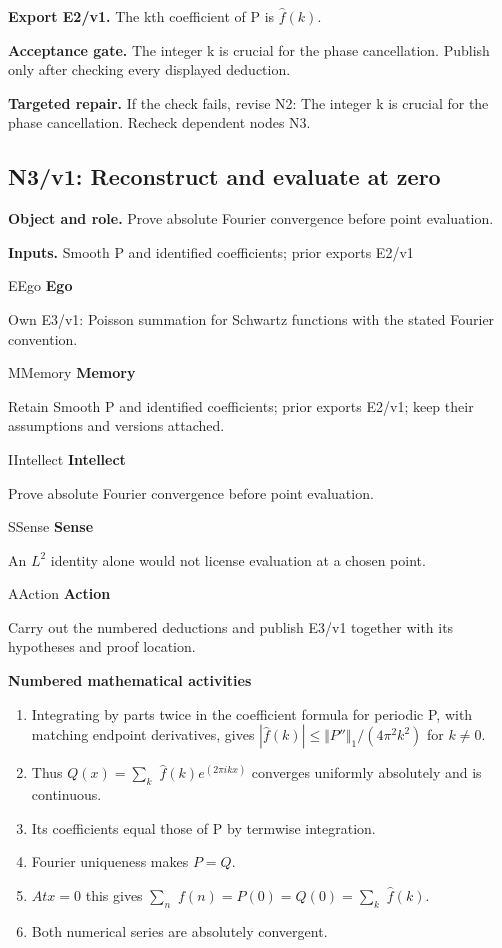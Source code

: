 \documentclass[preprint,12pt,aps,pra,showkeys,amsmath,amssymb,superscriptaddress,floatfix]{revtex4-2}
\theoremstyle{definition}
\theoremstyle{remark}
\newcommand{\mmfaculty}[3]{%
 \begin{mmfacultybox}{#1}{#2}
 {\sffamily\bfseries\color{MMBlue}#2}\par\smallskip #3
 \end{mmfacultybox}}
\newcommand{\field}[2]{\par\smallskip\noindent\textbf{#1.} #2\par}
\begin{document}
\field{Export E2/v1}{The kth coefficient of P is \(\widehat f(k)\).}

\field{Acceptance gate}{The integer k is crucial for the phase cancellation. Publish only after
checking every displayed deduction.}

\field{Targeted repair}{If the check fails, revise N2: The integer k is crucial for the phase
cancellation. Recheck dependent nodes N3.}

\clearpage

\subsection{N3/v1: Reconstruct and evaluate at zero}

\field{Object and role}{Prove absolute Fourier convergence before point evaluation.}

\field{Inputs}{Smooth P and identified coefficients; prior exports E2/v1}

\mmfaculty{E}{Ego}{Own E3/v1: Poisson summation for Schwartz functions with the stated
Fourier convention.}

\mmfaculty{M}{Memory}{Retain Smooth P and identified coefficients; prior exports E2/v1; keep
their assumptions and versions attached.}

\mmfaculty{I}{Intellect}{Prove absolute Fourier convergence before point evaluation.}

\mmfaculty{S}{Sense}{An \(L^{2}\) identity alone would not license evaluation at a chosen
point.}

\mmfaculty{A}{Action}{Carry out the numbered deductions and publish E3/v1 together with its
hypotheses and proof location.}

\smallskip\noindent\textbf{Numbered mathematical activities}

\begin{enumerate}[label=N3.\arabic*,leftmargin=3.4em]

\item Integrating by parts twice in the coefficient formula for periodic P,
with matching endpoint derivatives, gives
\(|\widehat f(k)|\le \Vert P''\Vert _{1}/(4\pi ^{2}k^{2})\) for
\(k\ne 0\).

\item Thus \(Q(x)=\sum _k\) \(\widehat f(k)e^{(2\pi ikx)}\) converges
uniformly absolutely and is continuous.

\item Its coefficients equal those of P by termwise integration.

\item Fourier uniqueness makes \(P=Q\).

\item \(Atx=0\) this gives \(\sum _n\) \(f(n)=P(0)=Q(0)=\sum _k\)
\(\widehat f(k)\).

\item Both numerical series are absolutely convergent.

\end{enumerate}
\end{document}

